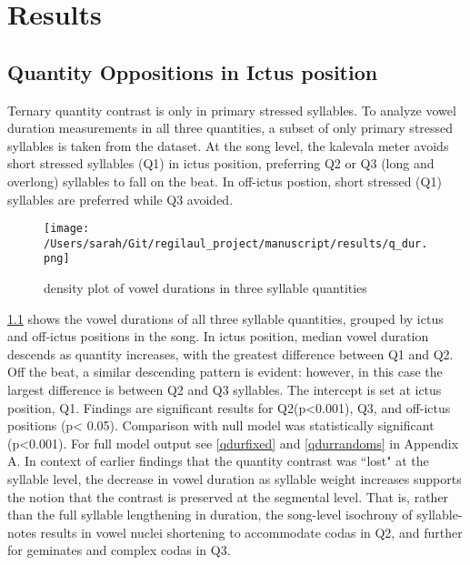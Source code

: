\chapter{Results}
%

\section{Quantity Oppositions in Ictus position}


Ternary quantity contrast is only in primary stressed syllables. To analyze vowel duration measurements in all three quantities, a subset of only primary stressed syllables is taken from the dataset. 
At the song level, the kalevala meter avoids short stressed syllables (Q1) in ictus position, preferring Q2 or Q3 (long and overlong) syllables to fall on the beat. In off-ictus postion, short stressed (Q1) syllables are preferred while Q3 avoided.


\begin{figure}[htb]
\centering
\texttt{[image: /Users/sarah/Git/regilaul\_project/manuscript/results/q\_dur.png]}
\caption{density plot of vowel durations in three syllable quantities}
\label{qdur}

\end{figure}
%


\ref{qdur} shows the vowel durations of all three syllable quantities, grouped by ictus and off-ictus positions in the song. In ictus position, median vowel duration descends as quantity increases, with the greatest difference between Q1 and Q2. Off the beat, a similar descending pattern is evident: however, in this case the largest difference is between Q2 and Q3 syllables. 
 The intercept is set at ictus position, Q1. Findings are significant results for Q2(p<0.001), Q3, and off-ictus positions (p< 0.05). Comparison with null model was statistically significant (p<0.001). For full model output see \ref{qdurfixed} and \ref{qdurrandoms} in Appendix A. In context of earlier findings that the quantity contrast was ``lost" at the syllable level, the decrease in vowel duration as syllable weight increases supports the notion that the contrast is preserved at the segmental level. That is, rather than the full syllable lengthening in duration, the song-level isochrony of syllable-notes results in vowel nuclei shortening to accommodate codas in Q2, and further for geminates and complex codas in Q3. 
 
